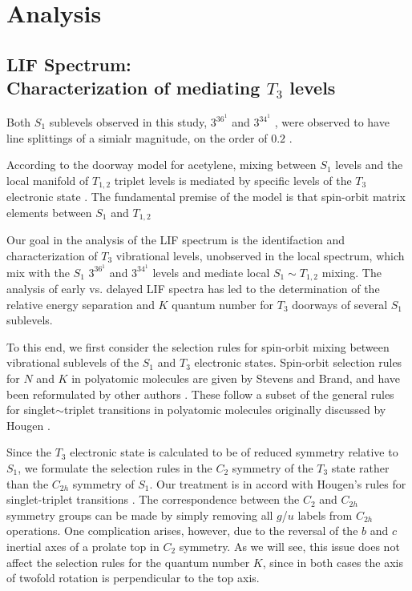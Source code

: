 \documentclass[12pt]{mitthesis}
\begin{document}
\section{Analysis}

\subsection{LIF Spectrum: \\Characterization of mediating $T_3$
  levels}

Both $S_1$ sublevels observed in this study, $3^36^1$  and
$3^34^1$ , were observed to have line splittings of a simialr
magnitude, on the order of $0.2$ \rcm.

According to the doorway model for acetylene, mixing between $S_1$
levels and the local manifold of $T_{1,2}$ triplet levels is mediated
by specific levels of the $T_3$ electronic state .  The fundamental premise of the model is that spin-orbit
matrix elements between $S_1$ and $T_{1,2}$


Our goal in the analysis of the LIF spectrum is the identifaction and
characterization of $T_3$ vibrational levels, unobserved in the local
spectrum, which mix with the $S_1$ $3^36^1$ and $3^34^1$ levels and
mediate local $S_1 \sim T_{1,2}$ mixing.  The analysis of early
vs. delayed LIF spectra has led to the determination of the relative
energy separation and $K$ quantum number for $T_3$ doorways of several
$S_1$ sublevels.

To this end, we first consider the selection rules for spin-orbit
mixing between vibrational sublevels of the $S_1$ and $T_3$ electronic
states.  Spin-orbit selection rules for $N$ and $K$ in polyatomic
molecules are given by Stevens and Brand, and have been reformulated
by other authors \cite{stevens73, howard78, dupre84}.  These follow a
subset of the general rules for singlet$\sim$triplet transitions in
polyatomic molecules originally discussed by Hougen \cite{hougen64}.

Since the $T_3$ electronic state is calculated to be of reduced
symmetry relative to $S_1$, we formulate the selection rules in the
$C_2$ symmetry of the $T_3$ state rather than the $C_{2h}$ symmetry of
$S_1$.  Our treatment is in accord with Hougen's rules for
singlet-triplet transitions \cite{hougen64}.  The correspondence
between the $C_2$ and $C_{2h}$ symmetry groups can be made by simply
removing all $g$/$u$ labels from $C_{2h}$ operations.  One
complication arises, however, due to the reversal of the $b$ and $c$
inertial axes of a prolate top in $C_2$ symmetry.  As we will see, this
issue does not affect the selection rules for the quantum number $K$,
since in both cases the axis of twofold rotation is perpendicular to
the top axis.
\end{document}
